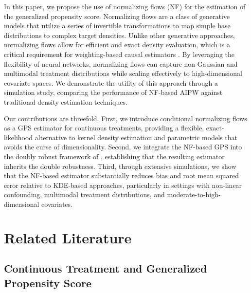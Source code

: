 \documentclass[12pt]{article}
\theoremstyle{definition}
\begin{document}
In this paper, we propose the use of normalizing flows (NF) for the estimation of the generalized propensity score. Normalizing flows are a class of generative models that utilize a series of invertible transformations to map simple base distributions to complex target densities. Unlike other generative approaches, normalizing flows allow for efficient and exact density evaluation, which is a critical requirement for weighting-based causal estimators \citep{kobyzev2021normalizing}. By leveraging the flexibility of neural networks, normalizing flows can capture non-Gaussian and multimodal treatment distributions while scaling effectively to high-dimensional covariate spaces. We demonstrate the utility of this approach through a simulation study, comparing the performance of NF-based AIPW against traditional density estimation techniques.

Our contributions are threefold. First, we introduce conditional normalizing flows as a GPS estimator for continuous treatments, providing a flexible, exact-likelihood alternative to kernel density estimation and parametric models that avoids the curse of dimensionality. Second, we integrate the NF-based GPS into the doubly robust framework of \citet{Zhang2025a}, establishing that the resulting estimator inherits the double robustness. Third, through extensive simulations, we show that the NF-based estimator substantially reduces bias and root mean squared error relative to KDE-based approaches, particularly in settings with non-linear confounding, multimodal treatment distributions, and moderate-to-high-dimensional covariates.

\section{Related Literature}

\subsection{Continuous Treatment and Generalized Propensity Score}
\end{document}
